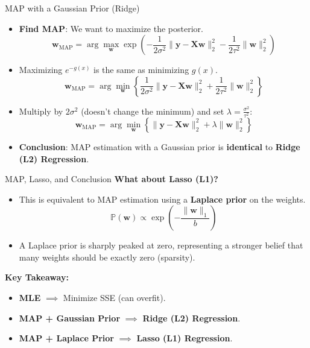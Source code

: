 \documentclass[serif, aspectratio=169]{beamer}
\begin{document}
\begin{frame}{MAP with a Gaussian Prior (Ridge)}
    \begin{itemize}
        \item \textbf{Find MAP}: We want to maximize the posterior.
        \[
        \mathbf{w}_{\text{MAP}} = \arg\max_{\mathbf{w}} 
        \exp\left( 
            -\frac{1}{2\sigma^2} \|\mathbf{y} - \mathbf{Xw}\|_2^2 
            - \frac{1}{2\tau^2} \|\mathbf{w}\|_2^2 
        \right)
        \]
        \item Maximizing $e^{-g(x)}$ is the same as minimizing $g(x)$.
        \[
        \mathbf{w}_{\text{MAP}} = \arg\min_{\mathbf{w}} 
        \left\{ 
            \frac{1}{2\sigma^2} \|\mathbf{y} - \mathbf{Xw}\|_2^2 
            + \frac{1}{2\tau^2} \|\mathbf{w}\|_2^2 
        \right\}
        \]
        \item Multiply by $2\sigma^2$ (doesn't change the minimum) and set $\lambda = \frac{\sigma^2}{\tau^2}$:
        \[
        \mathbf{w}_{\text{MAP}} = \arg\min_{\mathbf{w}} 
        \left\{ 
            \|\mathbf{y} - \mathbf{Xw}\|_2^2 
            + \lambda \|\mathbf{w}\|_2^2 
        \right\}
        \]
        \item \textbf{Conclusion}: MAP estimation with a Gaussian prior is \textbf{identical} to \textbf{Ridge (L2) Regression}.
    \end{itemize}
\end{frame}

\begin{frame}{MAP, Lasso, and Conclusion}
\textbf{What about Lasso (L1)?}
    \begin{itemize}
        \item This is equivalent to MAP estimation using a \textbf{Laplace prior} on the weights.
        \[
        \mathbb{P}(\mathbf{w}) \propto \exp\left( -\frac{\|\mathbf{w}\|_1}{b} \right)
        \]
        \item A Laplace prior is sharply peaked at zero, representing a stronger belief that many weights should be exactly zero (sparsity).
    \end{itemize}

    \textbf{Key Takeaway:}
    \begin{itemize}
        \item \textbf{MLE} $\implies$ Minimize SSE (can overfit).
        \item \textbf{MAP + Gaussian Prior} $\implies$ \textbf{Ridge (L2) Regression}.
        \item \textbf{MAP + Laplace Prior} $\implies$ \textbf{Lasso (L1) Regression}.
    \end{itemize}

\end{frame}
\end{document}
